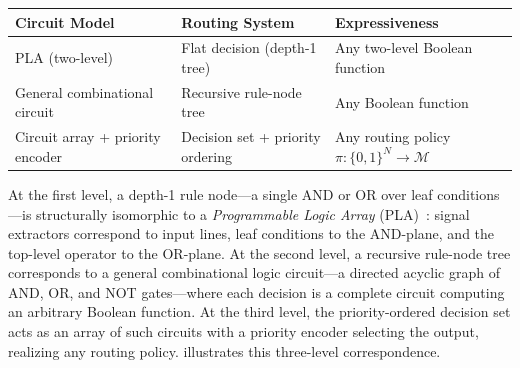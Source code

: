 \begin{center}
\begin{tabularx}{\linewidth}{
  >{\raggedright\arraybackslash}p{3.0cm}
  >{\raggedright\arraybackslash}p{3.0cm}
  >{\raggedright\arraybackslash}X
}
\toprule
\textbf{Circuit Model} & \textbf{Routing System} & \textbf{Expressiveness} \\
\midrule
PLA (two-level)~\cite{fleisher1975introduction}
  & Flat decision (depth-1 tree)
  & Any two-level Boolean function \\
General combinational circuit
  & Recursive rule-node tree
  & Any Boolean function \\
Circuit array + priority encoder
  & Decision set + priority ordering
  & Any routing policy $\pi: \{0,1\}^N \!\to\! \mathcal{M}$ \\
\bottomrule
\end{tabularx}
\end{center}

At the first level, a depth-1 rule node---a single AND or OR over leaf conditions---is structurally isomorphic to a \emph{Programmable Logic Array} (PLA)~\cite{fleisher1975introduction}: signal extractors correspond to input lines, leaf conditions to the AND-plane, and the top-level operator to the OR-plane.
At the second level, a recursive rule-node tree corresponds to a general combinational logic circuit---a directed acyclic graph of AND, OR, and NOT gates---where each decision is a complete circuit computing an arbitrary Boolean function.
At the third level, the priority-ordered decision set acts as an array of such circuits with a priority encoder selecting the output, realizing any routing policy.
 illustrates this three-level correspondence.

